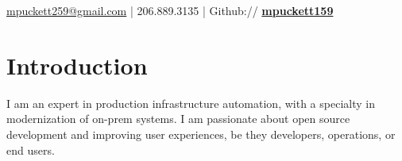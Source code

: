 \documentclass[letterpaper]{deedy-resume-openfont} %
\begin{document}


{
\href{mailto:mpuckett259@gmail.com}{mpuckett259@gmail.com} | 206.889.3135 | Github:// \href{https://github.com/mpuckett159}{\bf mpuckett159 } \\

\noindent\makebox[\linewidth]{\rule{\paperwidth}{0.4pt}}
\section{Introduction}
\begin{flushleft}
I am an expert in production infrastructure automation, with a specialty in modernization of on-prem systems. I am passionate about open source development and improving user experiences, be they developers, operations, or end users.
\end{flushleft}
\vspace{-10pt}
}

\end{document}

